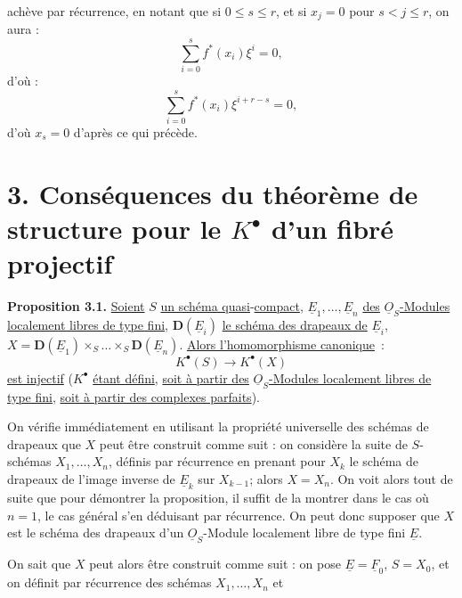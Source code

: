 
achève par
récurrence, en notant que si $0\leq s\leq r$, et si $x_j=0$ pour $s<j\leq r$, on aura :
\[
  \sum_{i=0}^{s}f^*(x_i)\xi^i=0,
\]
d'où :
\[
  \sum_{i=0}^{s}f^*(x_i)\xi^{i+r-s}=0,
\]
d'où $x_s=0$ d'après ce qui précède.

\section*{3. Conséquences du théorème de structure pour le \(K^{\bullet}\) d'un fibré projectif}

\textbf{Proposition 3.1.} \uline{Soient} \(S\) \uline{un schéma quasi}-\uline{compact}, \(\underline{E}_1,\ldots,\underline{E}_n\) \uline{des} \(\underline{O}_S\)\uline{-Modules localement libres de type fini}, \(\mathbf D(\underline{E}_i)\) \uline{le schéma des drapeaux de} \(\underline{E}_i\), \(X=\mathbf D(\underline{E}_1)\times_S\ldots\times_S \mathbf D(\underline{E}_n)\).
\uline{Alors l'homomorphisme canonique}~:
\[
  K^{\bullet}(S)\longrightarrow K^{\bullet}(X)
\]
\uline{est injectif} (\(K^{\bullet}\) \uline{étant défini}, \uline{soit à partir des} \(\underline{O}_S\)\uline{-Modules localement libres de type fini}, \uline{soit à partir des complexes parfaits}).

On vérifie immédiatement en utilisant la propriété universelle des schémas de drapeaux que \(X\) peut être construit comme suit : on considère la suite de \(S\)-schémas \(X_1,\ldots,X_n\), définis par récurrence en prenant pour \(X_k\) le schéma de drapeaux de l'image inverse de \(\underline{E}_k\) sur \(X_{k-1}\); alors \(X=X_n\). On voit alors tout de suite que pour démontrer la proposition, il suffit de la montrer dans le cas où \(n=1\), le cas général s'en déduisant par récurrence. On peut donc supposer que \(X\) est le schéma des drapeaux d'un \(\underline{O}_S\)-Module localement libre de type fini \(\underline{E}\).

On sait que \(X\) peut alors être construit comme suit : on pose \(\underline{E}=\underline{F}_0\), \(S=X_0\), et on définit par récurrence des schémas \(X_1,\ldots,X_n\) et
